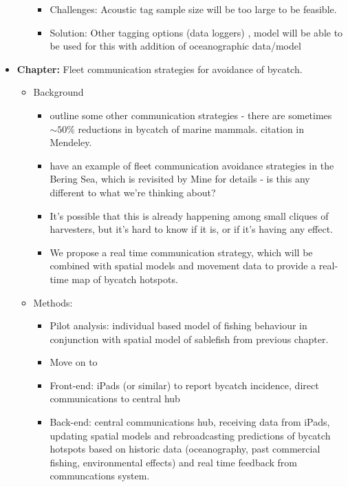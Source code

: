 \documentclass{article}
\newcommand{\sj}[1]{{\color{red}\mbox{}\marginpar{\raggedleft\hspace{0pt}*} #1}}
\begin{document}
\begin{itemize}
\begin{itemize}
\begin{itemize}
          \item Challenges: Acoustic tag sample size will be too large to be feasible.
          \item Solution: Other tagging options (data loggers) \citep{righton2008reconstructing}, model will be able to be used for this with addition of oceanographic data/model
        \end{itemize}
    \end{itemize}
  \item {\bf Chapter:} Fleet communication strategies for avoidance of bycatch.
    \begin{itemize}
      \item Background
        \begin{itemize}
          \item \citet{hall2005managing} outline some other communication strategies - there are sometimes $\sim 50\%$ reductions in bycatch of marine mammals. \sj{citation in Mendeley.}
          \item \citet{gauvin1995implementation} have an example of fleet communication avoidance strategies in the Bering Sea, which is revisited by \citet{gilman2006fleet} \sj{Mine for details - is this any different to what we're thinking about?}
          \item It's possible that this is already happening among small cliques of harvesters, but it's hard to know if it is, or if it's having any effect.
          \item We propose a real time communication strategy, which will be combined with spatial models and movement data to provide a real-time map of bycatch hotspots.
        \end{itemize}
      \item Methods:
        \begin{itemize}
          \item Pilot analysis: individual based model of fishing behaviour in conjunction with spatial model of sablefish from previous chapter.
          \item Move on to 
          \item Front-end: iPads (or similar) to report bycatch incidence, direct communications to central hub
          \item Back-end: central communications hub, receiving data from iPads, updating spatial models and rebroadcasting predictions of bycatch hotspots based on historic data (oceanography, past commercial fishing, environmental effects) and real time feedback from communcations system.

\end{itemize}
\end{itemize}
\end{itemize}
\end{document}
